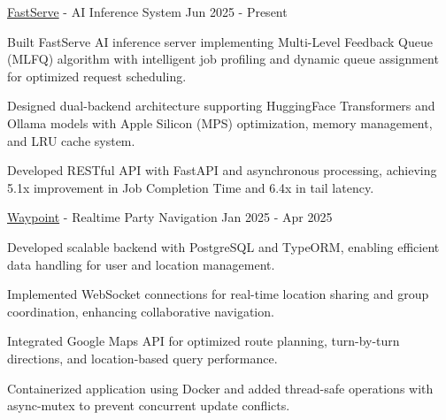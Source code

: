 \vspace{-4mm}



\cventry
    {\href{https://github.com/howwyhoward/FastServe}{FastServe} - AI Inference System} %
    {} %
    {} %
    {Jun 2025 - Present} %
    { %
        \begin{cvitems}
            \item {Built FastServe AI inference server implementing Multi-Level Feedback Queue (MLFQ) algorithm with intelligent job profiling and dynamic queue assignment for optimized request scheduling.}
            \item {Designed dual-backend architecture supporting HuggingFace Transformers and Ollama models with Apple Silicon (MPS) optimization, memory management, and LRU cache system.}
            \item {Developed RESTful API with FastAPI and asynchronous processing, achieving 5.1x improvement in Job Completion Time and 6.4x in tail latency.}
        \end{cvitems}  
    }
\vspace{1mm}
\cventry  
    {\href{https://github.com/khanna-parth/MapsProject}{Waypoint} - Realtime Party Navigation} %
    {} %
    {} %
    {Jan 2025 - Apr 2025} %
    { %
        \begin{cvitems}  
            \item {Developed scalable backend with PostgreSQL and TypeORM, enabling efficient data handling for user and location management.}  
            \item {Implemented WebSocket connections for real-time location sharing and group coordination, enhancing collaborative navigation.}  
            \item {Integrated Google Maps API for optimized route planning, turn-by-turn directions, and location-based query performance.} 
            \item {Containerized application using Docker and added thread-safe operations with async-mutex to prevent concurrent update conflicts.}   
        \end{cvitems}  
    }
